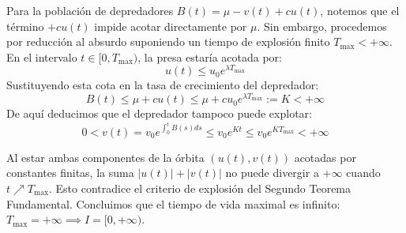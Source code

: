 {\begin{enumerate}[label=(\alph*)]
        Para la población de depredadores $B(t) = \mu - v(t) + cu(t)$, notemos que el término $+cu(t)$ impide acotar directamente por $\mu$. Sin embargo, procedemos por reducción al absurdo suponiendo un tiempo de explosión finito $T_{\max} < +\infty$.
        En el intervalo $t \in [0, T_{\max})$, la presa estaría acotada por:
        \[
            u(t) \le u_0 e^{\lambda T_{\max}}
        \]
        Sustituyendo esta cota en la tasa de crecimiento del depredador:
        \[
            B(t) \le \mu + cu(t) \le \mu + c u_0 e^{\lambda T_{\max}} := K < +\infty
        \]
        De aquí deducimos que el depredador tampoco puede explotar:
        \[
            0 < v(t) = v_0 e^{\int_0^t B(s) ds} \le v_0 e^{K t} \le v_0 e^{K T_{\max}} < +\infty
        \]
        
        Al estar ambas componentes de la órbita $(u(t), v(t))$ acotadas por constantes finitas, la suma $|u(t)|+|v(t)|$ no puede divergir a $+\infty$ cuando $t \nearrow T_{\max}$. Esto contradice el criterio de explosión del Segundo Teorema Fundamental. Concluimos que el tiempo de vida maximal es infinito: $T_{\max} = +\infty \implies I = [0, +\infty)$.
    \end{enumerate}

}
